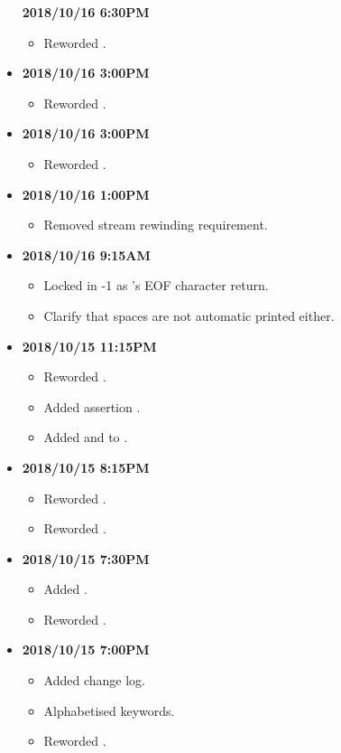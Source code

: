 \documentclass[../gazprea.tex]{subfiles}
\begin{document}
\begin{itemize}
    \textbf{2018/10/16 6:30PM}
    \begin{itemize}
      \item Reworded .
    \end{itemize}
  \item
    \textbf{2018/10/16 3:00PM}
    \begin{itemize}
      \item Reworded .
    \end{itemize}
  \item
    \textbf{2018/10/16 3:00PM}
    \begin{itemize}
      \item Reworded .
    \end{itemize}
  \item
    \textbf{2018/10/16 1:00PM}
    \begin{itemize}
      \item Removed stream rewinding requirement.
    \end{itemize}
  \item
    \textbf{2018/10/16 9:15AM}
    \begin{itemize}
      \item Locked in -1 as 's EOF character return.
      \item Clarify that spaces are not automatic printed either.
    \end{itemize}
  \item
    \textbf{2018/10/15 11:15PM}
    \begin{itemize}
      \item Reworded .
      \item Added assertion .
      \item Added  and  to .
    \end{itemize}
  \item
    \textbf{2018/10/15 8:15PM}
    \begin{itemize}
      \item Reworded .
      \item Reworded .
    \end{itemize}
  \item
    \textbf{2018/10/15 7:30PM}
    \begin{itemize}
      \item Added .
      \item Reworded .
    \end{itemize}
  \item
    \textbf{2018/10/15 7:00PM}
    \begin{itemize}
      \item Added change log.
      \item Alphabetised keywords.
      \item Reworded .
    \end{itemize}
\end{itemize}
\end{document}

